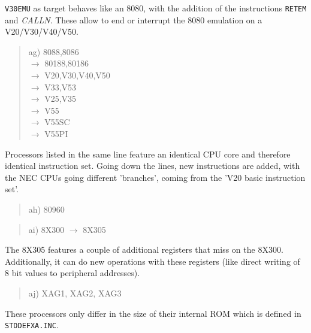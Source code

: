 \documentclass[12pt,twoside]{report}
\newcommand{\tty}[1]{{\tt #1}}
\begin{document}
{\tt V30EMU} as target behaves like an 8080, with the addition of
the instructions {\tt RETEM} and {\em CALLN}.  These allow to
end or interrupt the 8080 emulation on a V20/V30/V40/V50.
\begin{quote}
ag) 8088,8086 \\
$\rightarrow$ 80188,80186 \\
$\rightarrow$ V20,V30,V40,V50 \\
$\rightarrow$ V33,V53 \\
$\rightarrow$ V25,V35 \\
$\rightarrow$ V55 \\
$\rightarrow$ V55SC \\
$\rightarrow$ V55PI
\end{quote}
Processors listed in the same line feature an identical CPU core and therefore
identical instruction set.  Going down the lines, new instructions are added, 
with the NEC CPUs going different 'branches', coming from the 'V20 basic
instruction set'.
\begin{quote}
ah) 80960
\end{quote}
\begin{quote}
ai) 8X300 $\rightarrow$ 8X305
\end{quote}
The 8X305 features a couple of additional registers that miss on the
8X300.  Additionally, it can do new operations with these registers
(like direct writing of 8 bit values to peripheral addresses).
\begin{quote}
aj) XAG1, XAG2, XAG3
\end{quote}
These processors only differ in the size of their internal ROM which
is defined in \tty{STDDEFXA.INC}.
\end{document}
